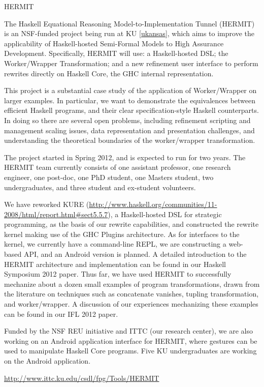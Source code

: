 \begin{hcarentry}[updated]{HERMIT}
\label{HERMIT}
\makeheader

The Haskell Equational Reasoning Model-to-Implementation Tunnel
(HERMIT) is an NSF-funded project being run at KU \cref{ukansas}, which aims to improve the
applicability of Haskell-hosted Semi-Formal Models to High Assurance Development.
Specifically, HERMIT will use: a Haskell-hosted DSL; the Worker/Wrapper Transformation;
and a new refinement user interface to perform rewrites directly on Haskell Core, the GHC internal representation.

This project is a substantial case study of the application of
Worker/Wrapper on larger examples. In particular, we want to
demonstrate the equivalences between efficient Haskell programs, and
their clear specification-style Haskell counterparts. In doing so
there are several open problems, including refinement scripting and
management scaling issues, data representation and presentation
challenges, and understanding the theoretical boundaries of the
worker/wrapper transformation.

The project started in Spring 2012, and is expected to run for two years.
The HERMIT team currently consists of
one assistant professor, %
one research engineer, %
one post-doc, %
one PhD student, %
one Masters student, %
two undergraduates,
and three student and ex-student volunteers. %
%
%

We have reworked KURE (\url{http://www.haskell.org/communities/11-2008/html/report.html#sect5.5.7}), a Haskell-hosted DSL for strategic programming, as the basis of our rewrite capabilities, and constructed the rewrite kernel making use of the GHC Plugins architecture.
As for interfaces to the kernel, we currently have a command-line REPL, we are constructing a web-based API, and an Android version is planned.
A detailed introduction to the HERMIT architecture and implementation can be found in our Haskell Symposium 2012 paper.
Thus far, we have used HERMIT to successfully mechanize about a dozen small examples of program transformations, drawn from the literature on techniques such as concatenate vanishes, tupling transformation, and worker/wrapper.
A discussion of our experiences mechanizing these examples can be found in our IFL 2012 paper.

Funded by the NSF REU initiative and ITTC (our research center),
we are also working on an Android application interface for HERMIT,
where gestures can be used to manipulate Haskell Core programs.
Five KU undergraduates are working on the Android application.

\FurtherReading
  \url{http://www.ittc.ku.edu/csdl/fpg/Tools/HERMIT}
\end{hcarentry}

